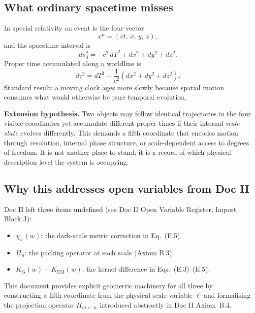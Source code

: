 \documentclass[11pt, a4paper, oneside]{article}
\theoremstyle{definition}
\theoremstyle{plain}
\theoremstyle{remark}
\newcommand{\Proj}[2]{\Pi_{#1 \leftarrow #2}}
\begin{document}
\subsection{What ordinary spacetime misses}

In special relativity an event is the four-vector
\begin{equation}
  x^\mu = (ct,\, x,\, y,\, z),
  \label{eq:4vec}
\end{equation}
and the spacetime interval is
\begin{equation}
  ds_4^2 = -c^2\,dT^2 + dx^2 + dy^2 + dz^2.
  \label{eq:SR_interval}
\end{equation}
Proper time accumulated along a worldline is
\begin{equation}
  d\tau^2 = dT^2 - \frac{1}{c^2}(dx^2 + dy^2 + dz^2).
  \label{eq:proper_time_SR}
\end{equation}
Standard result: a moving clock ages more slowly because spatial motion
consumes what would otherwise be pure temporal evolution.

\medskip
\noindent\textbf{Extension hypothesis.}
Two objects may follow identical trajectories in the four visible
coordinates yet accumulate different proper times if their internal
\emph{scale-state} evolves differently.
This demands a fifth coordinate that encodes motion through
resolution, internal phase structure, or scale-dependent access to
degrees of freedom.
It is not another place to stand; it is a record of which physical
description level the system is occupying.

\subsection{Why this addresses open variables from Doc II}

Doc II left three items undefined (see Doc II Open Variable Register,
Import Block J):
\begin{itemize}
  \item $\chi_w(w)$: the dark-scale metric correction in Eq.~(F.5).
  \item $\Pi_n$: the packing operator at each scale (Axiom B.3).
  \item $K_G(w) - K_\mathrm{EM}(w)$: the kernel difference in Eqs.~(E.3)--(E.5).
\end{itemize}
This document provides explicit geometric machinery for all three by
constructing a fifth coordinate from the physical scale variable $\ell$
and formalising the projection operator
$\Proj{m}{n}$ introduced abstractly in Doc II Axiom~B.4.
\end{document}
